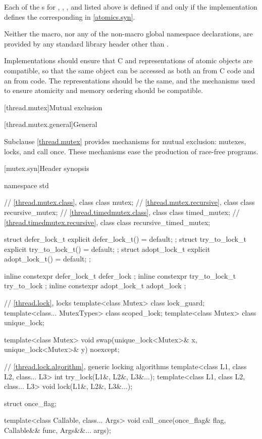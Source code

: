 \pnum
Each of the s for
, , , and 
listed above is defined if and only if the implementation defines
the corresponding  in \ref{atomics.syn}.

\pnum
Neither the  macro,
nor any of the non-macro global namespace declarations,
are provided by any \Cpp{} standard library header
other than .

\pnum
\recommended
Implementations should ensure
that C and \Cpp{} representations of atomic objects are compatible,
so that the same object can be accessed as both an 
from C code and an  from \Cpp{} code.
The representations should be the same, and
the mechanisms used to ensure atomicity and memory ordering
should be compatible.

[thread.mutex]{Mutual exclusion}

[thread.mutex.general]{General}

\pnum
Subclause \ref{thread.mutex} provides mechanisms for mutual exclusion: mutexes, locks, and call
once. These mechanisms ease the production of race-free
programs.

[mutex.syn]{Header  synopsis}

%
\begin{codeblock}
namespace std {
  // \ref{thread.mutex.class}, class 
  class mutex;
  // \ref{thread.mutex.recursive}, class 
  class recursive_mutex;
  // \ref{thread.timedmutex.class}, class 
  class timed_mutex;
  // \ref{thread.timedmutex.recursive}, class 
  class recursive_timed_mutex;

  struct defer_lock_t { explicit defer_lock_t() = default; };
  struct try_to_lock_t { explicit try_to_lock_t() = default; };
  struct adopt_lock_t { explicit adopt_lock_t() = default; };

  inline constexpr defer_lock_t  defer_lock { };
  inline constexpr try_to_lock_t try_to_lock { };
  inline constexpr adopt_lock_t  adopt_lock { };

  // \ref{thread.lock}, locks
  template<class Mutex> class lock_guard;
  template<class... MutexTypes> class scoped_lock;
  template<class Mutex> class unique_lock;

  template<class Mutex>
    void swap(unique_lock<Mutex>& x, unique_lock<Mutex>& y) noexcept;

  // \ref{thread.lock.algorithm}, generic locking algorithms
  template<class L1, class L2, class... L3> int try_lock(L1&, L2&, L3&...);
  template<class L1, class L2, class... L3> void lock(L1&, L2&, L3&...);

  struct once_flag;

  template<class Callable, class... Args>
    void call_once(once_flag& flag, Callable&& func, Args&&... args);
}
\end{codeblock}

